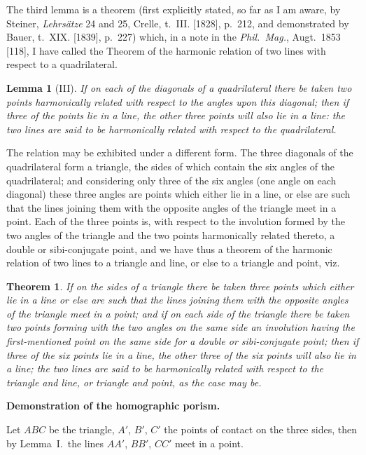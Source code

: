 \documentclass[12pt,a4paper]{article}
\theoremstyle{plain}
\newtheorem{theorem}{Theorem}
\newtheorem{lemma}{Lemma}
\theoremstyle{definition}
\begin{document}
\newpage
The third lemma is a theorem (first explicitly stated, so far as I am aware, by Steiner, \textit{Lehrs\"{a}tze} 24 and 25, Crelle, t.~III. [1828], p.~212, and demonstrated by Bauer, t.~XIX. [1839], p.~227) which, in a note in the \textit{Phil.\ Mag.}, Augt.\ 1853 [118], I have called the Theorem of the harmonic relation of two lines with respect to a quadrilateral.

\begin{lemma}[III]
If on each of the diagonals of a quadrilateral there be taken two points harmonically related with respect to the angles upon this diagonal; then if three of the points lie in a line, the other three points will also lie in a line: the two lines are said to be harmonically related with respect to the quadrilateral.
\end{lemma}

The relation may be exhibited under a different form. The three diagonals of the quadrilateral form a triangle, the sides of which contain the six angles of the quadrilateral; and considering only three of the six angles (one angle on each diagonal) these three angles are points which either lie in a line, or else are such that the lines joining them with the opposite angles of the triangle meet in a point. Each of the three points is, with respect to the involution formed by the two angles of the triangle and the two points harmonically related thereto, a double or sibi-conjugate point, and we have thus a theorem of the harmonic relation of two lines to a triangle and line, or else to a triangle and point, viz.

\begin{theorem}
If on the sides of a triangle there be taken three points which either lie in a line or else are such that the lines joining them with the opposite angles of the triangle meet in a point; and if on each side of the triangle there be taken two points forming with the two angles on the same side an involution having the first-mentioned point on the same side for a double or sibi-conjugate point; then if three of the six points lie in a line, the other three of the six points will also lie in a line; the two lines are said to be harmonically related with respect to the triangle and line, or triangle and point, as the case may be.
\end{theorem}

\textbf{Demonstration of the homographic porism.}

Let $ABC$ be the triangle, $A'$, $B'$, $C'$ the points of contact on the three sides, then by Lemma~I.\ the lines $AA'$, $BB'$, $CC'$ meet in a point.
\end{document}
